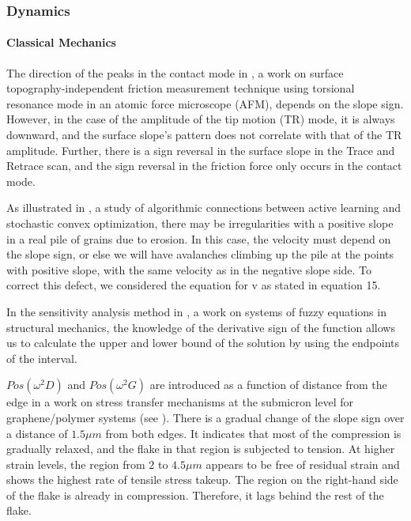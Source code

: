 \documentclass[11pt]{book}
\begin{document}

\subsubsection{Dynamics}

\paragraph{Classical Mechanics}

The direction of the peaks in the contact mode in \cite{bhushan2004surface}, a work on surface topography-independent friction measurement
technique using torsional resonance mode in an atomic force
microscope (AFM), depends on the slope sign. However, in the case of the amplitude of the tip motion (TR) mode, it
is always downward, and the surface slope's pattern does not correlate
with that of the TR amplitude. Further, there is a sign reversal in
the surface slope in the Trace and Retrace scan, and the sign reversal
in the friction force only occurs in the contact mode.

As illustrated in \cite{ramdas2013algorithmic}, a study of algorithmic connections between active learning and
stochastic convex optimization, there may be irregularities
with a positive slope in a real pile of grains due to erosion. In
this case, the velocity must depend on the slope sign, or else we
will have avalanches climbing up the pile at the points with positive
slope, with the same velocity as in the negative slope side. To correct
this defect, we considered the equation for v as stated in equation
15.

In the sensitivity analysis method in \cite{skalna2008systems}, a work on systems of fuzzy equations in
structural mechanics, the
knowledge of the derivative sign of the function allows us to calculate
the upper and lower bound of the solution by using the endpoints of
the interval.

$Pos\left(\omega^{2}D\right)$ and $Pos\left(\omega^{2}G\right)$
are introduced as a function of distance from the edge in a work on stress transfer mechanisms at the submicron level
for graphene/polymer systems (see \cite{anagnostopoulos2015stress}).
There is a gradual change of the slope sign over a distance of $1.5\mu m$
from both edges. It indicates that most of the compression is gradually
relaxed, and the flake in that region is subjected to tension. At
higher strain levels, the region from $2$ to $4.5\mu m$ appears
to be free of residual strain and shows the highest rate of tensile
stress takeup. The region on the right-hand side of the flake is already
in compression. Therefore, it lags behind the rest of the flake.
\end{document}

